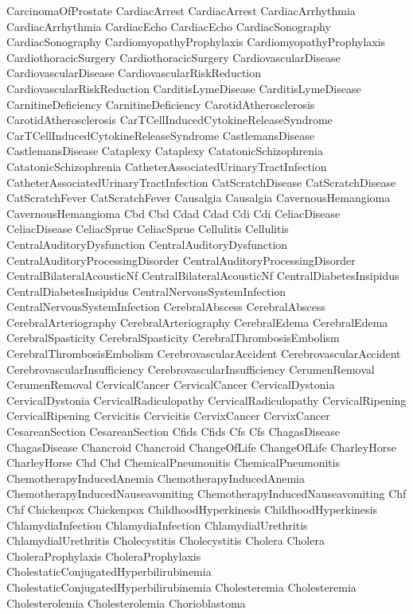  CarcinomaOfProstate
 CardiacArrest
 CardiacArrest
 CardiacArrhythmia
 CardiacArrhythmia
 CardiacEcho
 CardiacEcho
 CardiacSonography
 CardiacSonography
 CardiomyopathyProphylaxis
 CardiomyopathyProphylaxis
 CardiothoracicSurgery
 CardiothoracicSurgery
 CardiovascularDisease
 CardiovascularDisease
 CardiovascularRiskReduction
 CardiovascularRiskReduction
 CarditisLymeDisease
 CarditisLymeDisease
 CarnitineDeficiency
 CarnitineDeficiency
 CarotidAtherosclerosis
 CarotidAtherosclerosis
 CarTCellInducedCytokineReleaseSyndrome
 CarTCellInducedCytokineReleaseSyndrome
 CastlemansDisease
 CastlemansDisease
 Cataplexy
 Cataplexy
 CatatonicSchizophrenia
 CatatonicSchizophrenia
 CatheterAssociatedUrinaryTractInfection
 CatheterAssociatedUrinaryTractInfection
 CatScratchDisease
 CatScratchDisease
 CatScratchFever
 CatScratchFever
 Causalgia
 Causalgia
 CavernousHemangioma
 CavernousHemangioma
 Cbd
 Cbd
 Cdad
 Cdad
 Cdi
 Cdi
 CeliacDisease
 CeliacDisease
 CeliacSprue
 CeliacSprue
 Cellulitis
 Cellulitis
 CentralAuditoryDysfunction
 CentralAuditoryDysfunction
 CentralAuditoryProcessingDisorder
 CentralAuditoryProcessingDisorder
 CentralBilateralAcousticNf
 CentralBilateralAcousticNf
 CentralDiabetesInsipidus
 CentralDiabetesInsipidus
 CentralNervousSystemInfection
 CentralNervousSystemInfection
 CerebralAbscess
 CerebralAbscess
 CerebralArteriography
 CerebralArteriography
 CerebralEdema
 CerebralEdema
 CerebralSpasticity
 CerebralSpasticity
 CerebralThrombosisEmbolism
 CerebralThrombosisEmbolism
 CerebrovascularAccident
 CerebrovascularAccident
 CerebrovascularInsufficiency
 CerebrovascularInsufficiency
 CerumenRemoval
 CerumenRemoval
 CervicalCancer
 CervicalCancer
 CervicalDystonia
 CervicalDystonia
 CervicalRadiculopathy
 CervicalRadiculopathy
 CervicalRipening
 CervicalRipening
 Cervicitis
 Cervicitis
 CervixCancer
 CervixCancer
 CesareanSection
 CesareanSection
 Cfids
 Cfids
 Cfs
 Cfs
 ChagasDisease
 ChagasDisease
 Chancroid
 Chancroid
 ChangeOfLife
 ChangeOfLife
 CharleyHorse
 CharleyHorse
 Chd
 Chd
 ChemicalPneumonitis
 ChemicalPneumonitis
 ChemotherapyInducedAnemia
 ChemotherapyInducedAnemia
 ChemotherapyInducedNauseavomiting
 ChemotherapyInducedNauseavomiting
 Chf
 Chf
 Chickenpox
 Chickenpox
 ChildhoodHyperkinesis
 ChildhoodHyperkinesis
 ChlamydiaInfection
 ChlamydiaInfection
 ChlamydialUrethritis
 ChlamydialUrethritis
 Cholecystitis
 Cholecystitis
 Cholera
 Cholera
 CholeraProphylaxis
 CholeraProphylaxis
 CholestaticConjugatedHyperbilirubinemia
 CholestaticConjugatedHyperbilirubinemia
 Cholesteremia
 Cholesteremia
 Cholesterolemia
 Cholesterolemia
 Chorioblastoma
